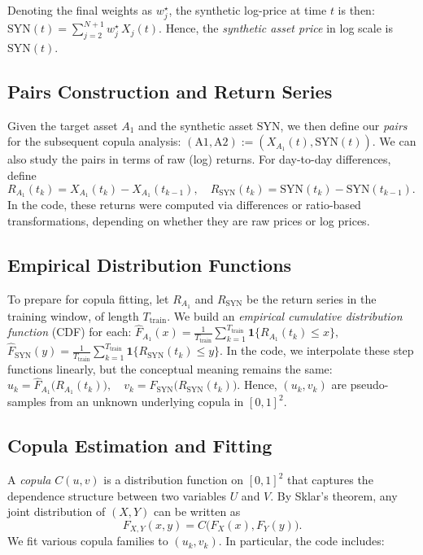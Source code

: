 Denoting the final weights as $w_j^{\star}$, the synthetic log-price at time $t$ is then:
$
\text{SYN}(t) = \sum_{j=2}^{N+1} w_j^{\star} \, X_j(t).
$
Hence, the \emph{synthetic asset price} in log scale is $\text{SYN}(t)$.

\subsection*{Pairs Construction and Return Series}
Given the target asset $A_1$ and the synthetic asset $\text{SYN}$, we then define our \emph{pairs} for the subsequent copula analysis:
$
(\text{A1}, \text{A2}) := (X_{A_1}(t), \text{SYN}(t)).
$
We can also study the pairs in terms of raw (log) returns. For day-to-day differences, define
$
R_{A_1}(t_k) = X_{A_1}(t_k) - X_{A_1}(t_{k-1}), \quad 
R_{\text{SYN}}(t_k) = \text{SYN}(t_k) - \text{SYN}(t_{k-1}).
$
In the code, these returns were computed via differences or ratio-based transformations, depending on whether they are raw prices or log prices.

\subsection*{Empirical Distribution Functions}
To prepare for copula fitting, let $R_{A_1}$ and $R_{\text{SYN}}$ be the return series in the training window, of length $T_{\text{train}}$. We build an \emph{empirical cumulative distribution function} (CDF) for each:
$
\hat{F}_{A_1}(x) = \frac{1}{T_{\text{train}}} \sum_{k=1}^{T_{\text{train}}} \mathbf{1}\bigl\{R_{A_1}(t_k) \le x \bigr\},
$
$
\hat{F}_{\text{SYN}}(y) = \frac{1}{T_{\text{train}}} \sum_{k=1}^{T_{\text{train}}} \mathbf{1}\bigl\{R_{\text{SYN}}(t_k) \le y \bigr\}.
$
In the code, we interpolate these step functions linearly, but the conceptual meaning remains the same: 
$
u_k = \hat{F}_{A_1}\bigl(R_{A_1}(t_k)\bigr),\quad
v_k = \hat{F}_{\text{SYN}}\bigl(R_{\text{SYN}}(t_k)\bigr).
$
Hence, $(u_k,v_k)$ are pseudo-samples from an unknown underlying copula in $[0,1]^2$.

\subsection*{Copula Estimation and Fitting}
A \emph{copula} $C(u,v)$ is a distribution function on $[0,1]^2$ that captures the dependence structure between two variables $U$ and $V$. By Sklar's theorem, any joint distribution of \((X,Y)\) can be written as
\[
F_{X,Y}(x,y) = C\bigl(F_X(x), F_Y(y)\bigr).
\]
We fit various copula families to \((u_k, v_k)\). In particular, the code includes:

